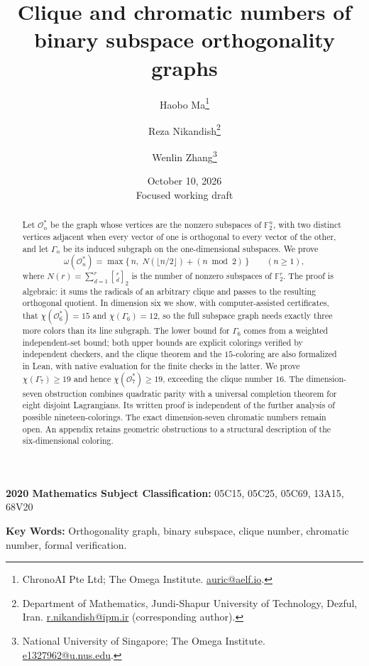 \documentclass[11pt]{article}
\title{Clique and chromatic numbers of binary subspace orthogonality graphs}
\author{Haobo Ma\thanks{ChronoAI Pte Ltd; The Omega Institute.
  \href{mailto:auric@aelf.io}{auric@aelf.io}.}
  \and
  Reza Nikandish\thanks{Department of Mathematics,
  Jundi-Shapur University of Technology, Dezful, Iran.
  \href{mailto:r.nikandish@ipm.ir}{r.nikandish@ipm.ir}
  (corresponding author).}
  \and
  Wenlin Zhang\thanks{National University of Singapore; The Omega Institute.
  \href{mailto:e1327962@u.nus.edu}{e1327962@u.nus.edu}.}}
\date{October 10, 2026\\[0.5ex]\small Focused working draft}
\theoremstyle{remark}
\theoremstyle{definition}
\newcommand{\F}{\mathbb F_2}
\newcommand{\OG}{\mathcal O}
\begin{document}
\maketitle

\begin{abstract}
Let $\OG_n^*$ be the graph whose vertices are the nonzero subspaces of
$\F^n$, with two distinct vertices adjacent when every vector of one is
orthogonal to every vector of the other, and let $\Gamma_n$ be its
induced subgraph on the one-dimensional subspaces. We prove
\[
  \omega(\OG_n^*)=\max\bigl\{\,n,\; N(\lfloor n/2\rfloor)+(n \bmod 2)\,\bigr\}
  \qquad (n\ge 1),
\]
where $N(r)=\sum_{d=1}^{r}\genfrac{[}{]}{0pt}{}{r}{d}_2$ is the number of nonzero
subspaces of $\F^r$. The proof is algebraic: it sums the radicals of an
arbitrary clique and passes to the resulting orthogonal quotient. In
dimension six we show, with computer-assisted certificates, that
$\chi(\OG_6^*)=15$ and $\chi(\Gamma_6)=12$, so the full subspace graph
needs exactly three more colors than its line subgraph. The lower bound
for $\Gamma_6$ comes from a weighted independent-set bound; both upper
bounds are explicit colorings verified by independent checkers, and the
clique theorem and the $15$-coloring are also formalized in Lean,
with native evaluation for the finite checks in the latter. We
prove $\chi(\Gamma_7)\geq19$ and hence $\chi(\OG_7^*)\geq19$,
exceeding the clique number $16$. The dimension-seven obstruction combines
quadratic parity with a universal completion theorem for eight disjoint
Lagrangians. Its written proof is independent of the further analysis of
possible nineteen-colorings. The exact dimension-seven chromatic numbers
remain open. An appendix retains geometric obstructions to a structural
description of the six-dimensional coloring.
\end{abstract}

\medskip
\noindent\textbf{2020 Mathematics Subject Classification:}
05C15, 05C25, 05C69, 13A15, 68V20

\medskip
\noindent\textbf{Key Words:}
Orthogonality graph, binary subspace, clique number,
chromatic number, formal verification.
\end{document}
